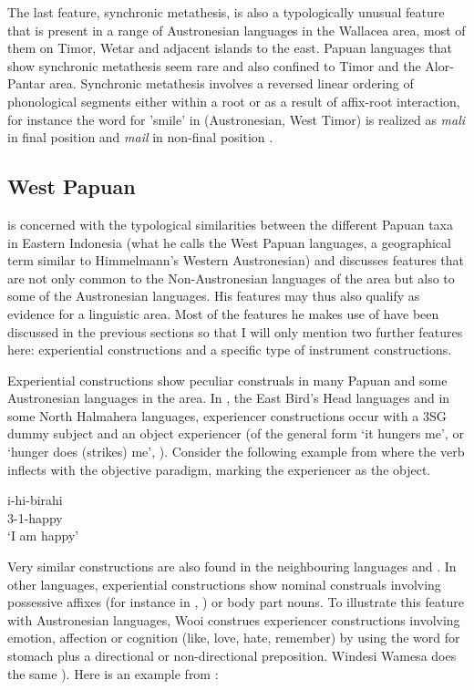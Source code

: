 The last feature, synchronic metathesis, is also a typologically unusual feature that is present in a range of Austronesian languages in the Wallacea area, most of them on Timor, Wetar and adjacent islands to the east. Papuan languages that show synchronic metathesis seem rare and also confined to Timor and the Alor-Pantar area. Synchronic metathesis involves a reversed linear ordering of phonological segments either within a root or as a result of affix-root interaction, for instance the word for 'smile' in  (Austronesian, West Timor) is realized as \textit{mali} in final position and \textit{mail} in non-final position \citep[134ff.]{schapper2015wallacea}.

\subsection{West Papuan}\label{sec:westpapuan}

\citet{reesink2005west} is concerned with the typological similarities between the different Papuan taxa in Eastern Indonesia (what he calls the West Papuan languages, a geographical term similar to Himmelmann's Western Austronesian) and discusses features that are not only common to the Non-Austronesian languages of the area but also to some of the Austronesian languages. His features may thus also qualify as evidence for a linguistic area. Most of the features he makes use of have been discussed in the previous sections so that I will only mention two further features here: experiential constructions and a specific type of instrument constructions. 

Experiential constructions show peculiar construals in many Papuan and some Austronesian languages in the area. In , the East Bird's Head languages and in some North Halmahera languages, experiencer constructions occur with a 3SG dummy subject and an object experiencer  (of the general form `it hungers me', or `hunger does (strikes) me', \citealt[191]{reesink2005west}). Consider the following example from  where the verb inflects with the objective paradigm, marking the experiencer as the object.

\ea 
\gll i-hi-birahi \\
3-1-happy \\
\glft `I am happy' \\ 
\z
\xe

Very similar constructions are also found in the neighbouring languages  and . In other languages, experiential constructions show nominal construals involving possessive affixes (for instance in , \citealt[192]{reesink2005west}) or body part nouns. To illustrate this feature with Austronesian languages, Wooi construes experiencer constructions involving emotion, affection or cognition (like, love, hate, remember) by using the word for stomach plus a directional or non-directional preposition. Windesi Wamesa does the same \citep[154]{gasser2014windesi}). Here is an example from :

